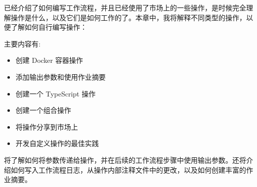 已经介绍了如何编写工作流程，并且已经使用了市场上的一些操作，是时候完全理解操作是什么，以及它们是如何工作的了。本章中，我将解释不同类型的操作，以便了解如何自行编写操作：

主要内容有:

\begin{itemize}
\item 
创建 Docker 容器操作

\item 
添加输出参数和使用作业摘要

\item 
创建一个 TypeScript 操作

\item 
创建一个组合操作

\item 
将操作分享到市场上

\item 
开发自定义操作的最佳实践
\end{itemize}

将了解如何将参数传递给操作，并在后续的工作流程步骤中使用输出参数。还将介绍如何写入工作流程日志，从操作内部注释文件中的更改，以及如何创建丰富的作业摘要。